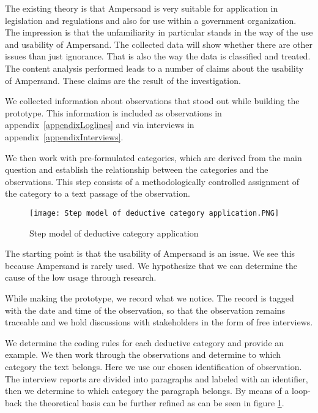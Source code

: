 The existing theory is that Ampersand is very suitable for application in legislation and regulations and also for use within a government organization.
The impression is that the unfamiliarity in particular stands in the way of the use and usability of Ampersand.
The collected data will show whether there are other issues than just ignorance.
That is also the way the data is classified and treated.
The content analysis performed leads to a number of claims about the usability of Ampersand.
These claims are the result of the investigation.

We collected information about observations that stood out while building the prototype.
This information is included as observations in appendix~\ref{appendixLoglines} and via interviews in appendix~\ref{appendixInterviews}.

\begin{comment}
Deductief redeneren is een top-down onderzoeksmethode. Je zoekt op basis van een generalisatie naar specifieke gevallen. Met behulp van deductief onderzoek toets je theorieën en hypothesen. Het proces bestaat over het algemeen uit vier stappen: er is een theorie (generalisering), je formuleert een hypothese, je observeert of analyseert, je bevestigt of verwerpt de hypothese.
\end{comment}

We then work with pre-formulated categories, which are derived from the main question and establish the relationship between the categories and the observations.
This step consists of a methodologically controlled assignment of the category to a text passage of the observation.
\begin{figure}[H]
    \centering
    \texttt{[image: Step model of deductive category application.PNG]}
    \caption{Step model of deductive category application~\citep{mayring_qualitative_2000}}
    \label{fig:step-model-of-deductive-category-application}
\end{figure}

The starting point is that the usability of Ampersand is an issue.
We see this because Ampersand is rarely used.
We hypothesize that we can determine the cause of the low usage through research.

While making the prototype, we record what we notice.
The record is tagged with the date and time of the observation, so that the observation remains traceable and we hold discussions with stakeholders in the form of free interviews.

We determine the coding rules for each deductive category and  provide an example.
We then work through the observations and determine to which category the text belongs.
Here we use our chosen identification of observation.
The interview reports are divided into paragraphs and labeled with an identifier, then we determine to which category the paragraph belongs.
By means of a loop-back the theoretical basis can be further refined as can be seen in figure \ref{fig:step-model-of-deductive-category-application}.

